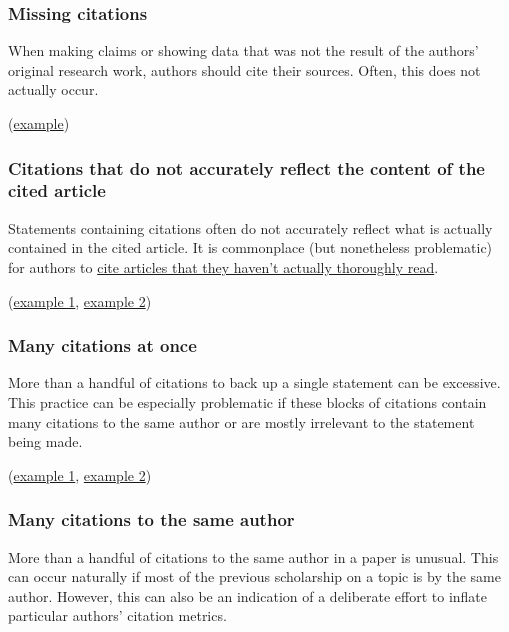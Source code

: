 \documentclass[letterpaper, 12pt]{article}
\begin{document}
\subsubsection*{Missing citations}

When making claims or showing data that was not the result of the authors' original research work, authors should cite their sources. Often, this does not actually occur.

(\href{https://pubpeer.com/publications/8A2CF2E1EBFD3ADCD835ADB91DDFE8}{example})

\subsubsection*{Citations that do not accurately reflect the content of the cited article}

Statements containing citations often do not accurately reflect what is actually contained in the cited article. It is commonplace (but nonetheless problematic) for authors to \href{https://ori.hhs.gov/citing-sources-were-not-read-or-thoroughly-understood}{cite articles that they haven't actually thoroughly read}.

(\href{https://pubpeer.com/publications/6E8756FAB18C392065D8313D271090}{example 1}, \href{https://pubpeer.com/publications/D3E493ADF94B3031D24C280F54F37E}{example 2})

\subsubsection*{Many citations at once}

More than a handful of citations to back up a single statement can be excessive. This practice can be especially problematic if these blocks of citations contain many citations to the same author or are mostly irrelevant to the statement being made.

(\href{https://pubpeer.com/publications/D6A50C6DD455715DE626C1CC56B8EB}{example 1}, \href{https://pubpeer.com/publications/11C10949E0FF4EA3C31B6A45F4E22C}{example 2})

\subsubsection*{Many citations to the same author}

More than a handful of citations to the same author in a paper is unusual. This can occur naturally if most of the previous scholarship on a topic is by the same author. However, this can also be an indication of a deliberate effort to inflate particular authors' citation metrics. 
\end{document}
